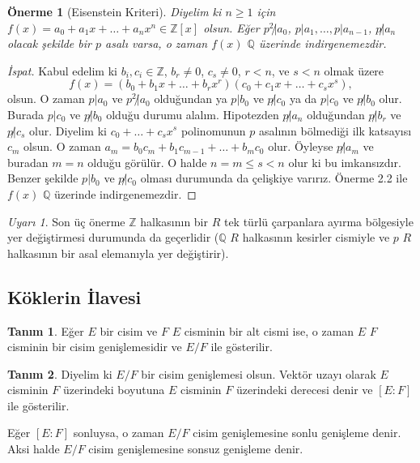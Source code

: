 \documentclass[draft]{article}
\newtheorem{prop}[thm]{Önerme}
\theoremstyle{definition}
\newtheorem{defn}{Tanım}[section]
\theoremstyle{remark}
\newtheorem{rem}{Uyarı}[section]
\begin{document}
			\begin{prop}[Eisenstein Kriteri]
				Diyelim ki $n \geq 1$ için $f(x) = a_0 + a_1x + \dots + a_{n}x^n \in \mathbb{Z}[x]$ olsun. Eğer $p^2 \not| a_0$, $p | a_1, \dots, p | a_{n - 1}$, $p \not| a_n$ olacak şekilde bir $p$ asalı varsa, o zaman $f(x)$ $\mathbb{Q}$ üzerinde indirgenemezdir.
			\end{prop}
			
			\begin{proof}[İspat]
				Kabul edelim ki $b_i, c_i \in \mathbb{Z}$, $b_r \neq 0$, $c_s \neq 0$, $r < n$, ve $s < n$ olmak üzere
				\begin{equation*}
					f(x) = (b_0 + b_1x + \dots + b_rx^r)(c_0 + c_1x + \dots + c_sx^s),
				\end{equation*}
				olsun. O zaman $p | a_0$ ve $p^2 \not| a_0$ olduğundan ya $p | b_0$ ve $p \not| c_0$ ya da $p | c_0$ ve $p \not| b_0$ olur. Burada $p | c_0$ ve $p \not| b_0$ olduğu durumu alalım. Hipotezden $p \not| a_n$ olduğundan $p \not| b_r$ ve $p \not| c_s$ olur. Diyelim ki $c_0 + \dots + c_sx^s$ polinomunun $p$ asalının bölmediği ilk katsayısı $c_m$ olsun. O zaman $a_m = b_0c_m + b_1c_{m - 1} + \dots + b_mc_0$ olur. Öyleyse $p \not| a_m$ ve buradan $m = n$ olduğu görülür. O halde $n = m \leq s < n$ olur ki bu imkansızdır. Benzer şekilde $p | b_0$ ve $p \not| c_0$ olması durumunda da çelişkiye varırız. Önerme 2.2 ile $f(x)$ $\mathbb{Q}$ üzerinde indirgenemezdir.
			\end{proof}
			
			\begin{rem}
			    Son üç önerme $\mathbb{Z}$ halkasının bir $R$ tek türlü çarpanlara ayırma bölgesiyle yer değiştirmesi durumunda da geçerlidir ($\mathbb{Q}$ $R$ halkasının kesirler cismiyle ve $p$ $R$ halkasının bir asal elemanıyla yer değiştirir).
			\end{rem}
			
		\subsection{Köklerin İlavesi}
		
			\begin{defn}
			    Eğer $E$ bir cisim ve $F$ $E$ cisminin bir alt cismi ise, o zaman $E$ $F$ cisminin bir cisim genişlemesidir ve $E/F$ ile gösterilir.
			\end{defn}
			
			\begin{defn}
			    Diyelim ki $E/F$ bir cisim genişlemesi olsun. Vektör uzayı olarak $E$ cisminin $F$ üzerindeki boyutuna $E$ cisminin $F$ üzerindeki derecesi denir ve $[E:F]$ ile gösterilir.\par
			    Eğer $[E : F]$ sonluysa, o zaman $E/F$ cisim genişlemesine sonlu genişleme denir. Aksi halde $E/F$ cisim genişlemesine sonsuz genişleme denir.
			\end{defn}
			
\end{document}
